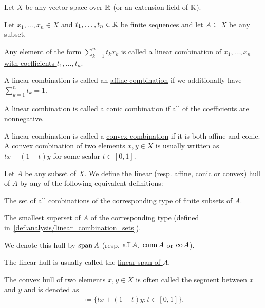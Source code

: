 Let $X$ be any vector space over $\mathbb{R}$ (or an extension field of $\mathbb{R}$).

\begin{definition}\label{def:analysis/linear_combinations}
  Let $x_1, \ldots, x_n \in X$ and $t_1, \ldots, t_n \in \mathbb{R}$ be finite sequences and let $A \subseteq X$ be any subset.

  \begin{defenum}
    \item Any element of the form $\sum_{k=1}^n t_k x_k$ is called a \uline{linear combination of $x_1, \ldots, x_n$ with coefficients $t_1, \ldots, t_n$}.
    \item A linear combination is called an \uline{affine combination} if we additionally have $\sum_{k=1}^n t_k = 1$.
    \item A linear combination is called a \uline{conic combination} if all of the coefficients are nonnegative.
    \item A linear combination is called a \uline{convex combination} if it is both affine and conic. A convex combination of two elements $x, y \in X$ is usually written as $tx + (1-t)y$ for some scalar $t \in [0, 1]$.
  \end{defenum}
\end{definition}

\begin{definition}\label{def:analysis:fund:hulls}
  Let $A$ be any subset of $X$. We define the \uline{linear (resp. affine, conic or convex) hull} of $A$ by any of the following equivalent definitions:
  \begin{defenum}
    \item The set of all combinations of the corresponding type of finite subsets of $A$.
    \item The smallest superset of $A$ of the corresponding type (defined in~\cref{def:analysis/linear_combination_sets}).
  \end{defenum}

  We denote this hull by $\operatorname{span} A$ (resp. $\operatorname{aff} A$, $\operatorname{conn} A$ or $\operatorname{co} A$).

  The linear hull is usually called the \uline{linear span of $A$}.

  The convex hull of two elements $x, y \in X$ is often called the segment between $x$ and $y$ and is denoted as
  \begin{align*}
    [x, y] \coloneqq \{ tx + (1-t)y \colon t \in [0, 1] \}.
  \end{align*}
\end{definition}

